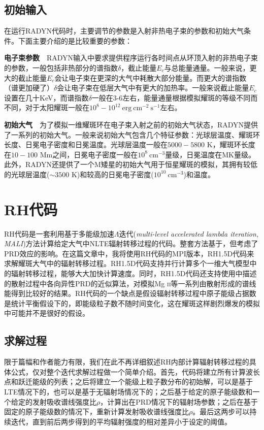 \subsection{初始输入}\label{sec:2.1.4}
在运行RADYN代码时，主要调节的参数是入射非热电子束的参数和初始大气条件。下面主要介绍的是比较重要的参数：

\textbf{电子束参数}\ \ RADYN输入中要求提供程序运行各时间点从环顶入射的非热电子束的参数，一般包括非热部分的谱指数$\delta$，截止能量$E_c$与总能量通量。一般来说，更大的截止能量$E_c$会让电子束在更深的大气中耗散大部分能量。而更大的谱指数（谱更加硬了）$\delta$会让电子束在低层大气中有更大的加热率。一般来说截止能量$E_c$设置在几十KeV，而谱指数$\delta$一般在3-6左右，能量通量根据模拟耀斑的等级不同而不同，对于太阳耀斑一般在$10^8-10^{12}\ \mathrm{erg\  cm^{-2}\  s^{-1}}$左右。

\textbf{初始大气}\ \ 
为了模拟一维耀斑环在电子束入射之前的初始大气状态，RADYN提供了一系列的初始大气。一般来说初始大气包含几个特征参数：光球层温度、耀斑环长度、日冕电子密度和日冕温度。光球层温度一般在$5000-5800$ K，耀斑环长度在$10-100$ Mm之间，日冕电子密度一般在$10^8\ \mathrm{cm^{-3}}$量级，日冕温度在MK量级。此外，RADYN还提供了一个M矮星的初始大气用于恒星耀斑的模拟，其拥有较低的光球层温度($\sim 3500$ K)和较高的日冕电子密度($10^{10}\ \mathrm{cm^{-3}}$)和温度。
\section{RH代码}
RH代码\parencites{Uitenbroek2001}是一套利用基于多能级加速$\Lambda$迭代(\textit{multi-level accelerated lambda iteration, MALI})方法计算给定大气中NLTE辐射转移过程的代码。整套方法基于\textcites{Rybicki1991}，但考虑了PRD效应的影响。在这篇文章中，我将使用RH代码的MPI版本，RH1.5D代码\parencites{Pereira2015b}来求解耀斑大气中的辐射转移过程。RH1.5D代码支持并行计算多个一维大气模型中的辐射转移过程，能够大大加快计算速度。同时，RH1.5D代码还支持使用\textcites{Leenaarts2012}中描述的散射过程中各向异性PRD的近似算法，对模拟Mg \textsc{ii}等一系列由散射形成的谱线能得到比较好的结果。RH代码的一个缺点是假设辐射转移过程中原子能级占据数是统计平衡假设下的，即能级粒子数不随时间变化，这在耀斑这样剧烈爆发的模拟中可能并不是很好的假设\parencites{Abbett1999,Rubio2017}。

\subsection{求解过程}
限于篇幅和作者能力有限，我们在此不再详细叙述RH内部计算辐射转移过程的具体公式，仅对整个迭代求解过程做一个简单介绍。首先，代码将建立所有计算波长点和跃迁能级的列表；之后将建立一个能级上粒子数分布的初始解，可以是基于LTE情况下的，也可以是基于无辐射场情况下的；之后基于给定的原子能级数和一个给定的发射吸收谱线强度比$\rho$，计算出在PRD情况下的辐射场参数；之后在基于固定的原子能级数的情况下，重新计算发射吸收谱线强度比$\rho$。最后这两步可以持续迭代，直到前后两步得到的平均辐射强度的相对差异小于设定的阈值。

